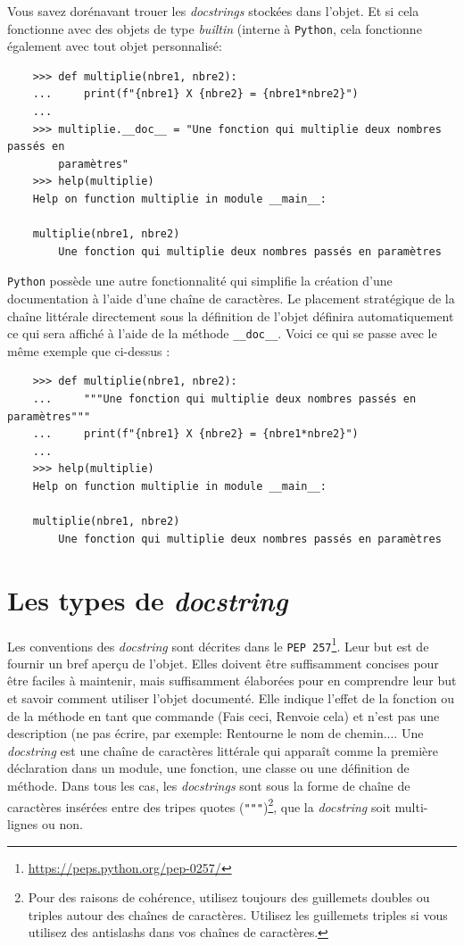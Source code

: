 \documentclass[a4paper,11pt]{book}
\begin{document}
Vous savez dorénavant trouer les \textit{docstrings} stockées dans l'objet. Et si cela fonctionne avec des objets de type \textit{builtin} (interne à \texttt{Python}, cela fonctionne également avec tout objet personnalisé:
\begin{verbatim}
    >>> def multiplie(nbre1, nbre2):
    ...     print(f"{nbre1} X {nbre2} = {nbre1*nbre2}")
    ...
    >>> multiplie.__doc__ = "Une fonction qui multiplie deux nombres passés en 
        paramètres"
    >>> help(multiplie)
    Help on function multiplie in module __main__:

    multiplie(nbre1, nbre2)
        Une fonction qui multiplie deux nombres passés en paramètres 
\end{verbatim}
\medskip

\texttt{Python} possède une autre fonctionnalité qui simplifie la création d'une documentation à l'aide d'une chaîne de caractères. Le placement stratégique de la chaîne littérale directement sous la définition de l'objet définira automatiquement ce qui sera affiché à l'aide de la méthode \texttt{\_\_doc\_\_}. Voici ce qui se passe avec le même exemple que ci-dessus :
\begin{verbatim}
    >>> def multiplie(nbre1, nbre2):
    ...     """Une fonction qui multiplie deux nombres passés en paramètres"""
    ...     print(f"{nbre1} X {nbre2} = {nbre1*nbre2}")
    ... 
    >>> help(multiplie)
    Help on function multiplie in module __main__:

    multiplie(nbre1, nbre2)
        Une fonction qui multiplie deux nombres passés en paramètres 
\end{verbatim}
\medskip

\section{Les types de \textit{docstring}}
Les conventions des \textit{docstring} sont décrites dans le \texttt{PEP 257}\footnote{\url{https://peps.python.org/pep-0257/}}. Leur but est de fournir un bref aperçu de l'objet. Elles doivent être suffisamment concises pour être faciles à maintenir, mais suffisamment élaborées pour en comprendre leur but et savoir comment utiliser l'objet documenté. Elle indique l'effet de la fonction ou de la méthode en tant que commande (\og Fais ceci\fg{}, \og Renvoie cela\fg{}) et n'est pas une description (ne pas écrire, par exemple: \og Rentourne le nom de chemin...\fg{}. Une \textit{docstring} est une chaîne de caractères littérale qui apparaît comme la première déclaration dans un module, une fonction, une classe ou une définition de méthode. Dans tous les cas, les \textit{docstrings} sont sous la forme de chaîne de caractères insérées entre des tripes quotes (\texttt{"""})\footnote{Pour des raisons de cohérence, utilisez toujours des guillemets doubles ou triples autour des chaînes de caractères. Utilisez les guillemets triples si vous utilisez des antislashs dans vos chaînes de caractères.}, que la \textit{docstring} soit multi-lignes ou non. 
\medskip
\end{document}
